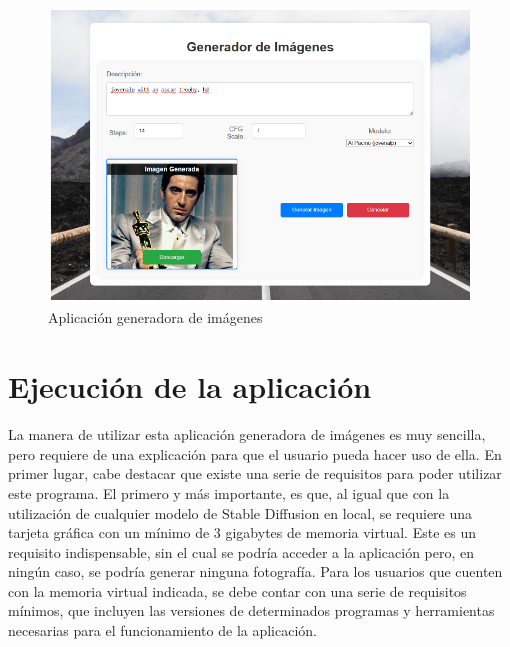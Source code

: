 \begin{figure}[!htb]
	\centering
	\includegraphics[width = 1
	\textwidth]{Imagenes/Vectorial/genapp.png}
	\caption{Aplicación generadora de imágenes}
	\label{fig:appgen}
\end{figure}




\section{Ejecución de la aplicación}

La manera de utilizar esta aplicación generadora de imágenes es muy sencilla, pero requiere de una explicación para que el usuario pueda hacer uso de ella. En primer lugar, cabe destacar que existe una serie de requisitos para poder utilizar este programa. El primero y más importante, es que, al igual que con la utilización de cualquier modelo de Stable Diffusion en local, se requiere una tarjeta gráfica con un mínimo de 3 gigabytes de memoria virtual. Este es un requisito indispensable, sin el cual se podría acceder a la aplicación pero, en ningún caso, se podría generar ninguna fotografía. Para los usuarios que cuenten con la memoria virtual indicada, se debe contar con una serie de requisitos mínimos, que incluyen las versiones de determinados programas y herramientas necesarias para el funcionamiento de la aplicación.\\

